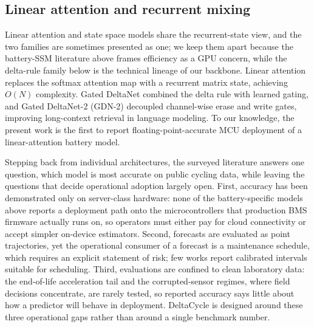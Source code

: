 \subsection{Linear attention and recurrent mixing}

Linear attention and state space models share the recurrent-state
view, and the two families are sometimes presented as one; we keep
them apart because the battery-SSM literature above frames
efficiency as a GPU concern, while the delta-rule family below is
the technical lineage of our backbone. Linear attention replaces the softmax attention map with a recurrent
matrix state, achieving $O(N)$ complexity. Gated DeltaNet
\cite{ref_gdn} combined the delta rule with learned gating, and
Gated DeltaNet-2 (GDN-2) \cite{ref_gdn2} decoupled channel-wise erase
and write gates, improving long-context retrieval in language
modeling. To our knowledge, the present work is the first to report
floating-point-accurate MCU deployment of a linear-attention battery model.

Stepping back from individual architectures, the surveyed literature
answers one question, which model is most accurate on public cycling
data, while leaving the questions that decide operational adoption
largely open. First, accuracy has been demonstrated only on
server-class hardware: none of the battery-specific models above
reports a deployment path onto the microcontrollers that production
BMS firmware actually runs on, so operators must either pay for
cloud connectivity or accept simpler on-device estimators. Second,
forecasts are evaluated as point trajectories, yet the operational
consumer of a forecast is a maintenance schedule, which requires an
explicit statement of risk; few works report calibrated intervals
suitable for scheduling. Third, evaluations are confined to clean
laboratory data: the end-of-life acceleration tail and the
corrupted-sensor regimes, where field decisions concentrate, are
rarely tested, so reported accuracy says little about how a
predictor will behave in deployment. DeltaCycle is designed around
these three operational gaps rather than around a single benchmark
number.
